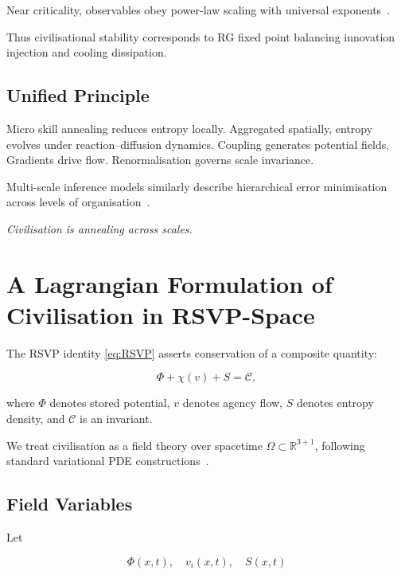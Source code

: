 \documentclass[12pt,a4paper]{article}
\theoremstyle{definition}
\begin{document}
Near criticality, observables obey power-law scaling
with universal exponents~\citep{stanley1971}.

Thus civilisational stability corresponds
to RG fixed point balancing innovation injection
and cooling dissipation.

\subsection{Unified Principle}

Micro skill annealing reduces entropy locally.
Aggregated spatially, entropy evolves under
reaction–diffusion dynamics.
Coupling generates potential fields.
Gradients drive flow.
Renormalisation governs scale invariance.

Multi-scale inference models similarly describe
hierarchical error minimisation across levels
of organisation~\citep{friston2023}.

\medskip
\begin{center}
  \itshape
  Civilisation is annealing across scales.
\end{center}


\section{A Lagrangian Formulation of Civilisation in RSVP-Space}
\label{sec:lagrangian}

The RSVP identity \eqref{eq:RSVP} asserts conservation of a composite
quantity:

\begin{equation}
  \Phi + \chi(v) + S = \mathcal{C},
\end{equation}

where $\Phi$ denotes stored potential,
$v$ denotes agency flow,
$S$ denotes entropy density,
and $\mathcal{C}$ is an invariant.

We treat civilisation as a field theory over spacetime
$\Omega \subset \mathbb{R}^{3+1}$,
following standard variational PDE constructions~\citep{evans2010}.

\subsection{Field Variables}

Let

\begin{equation}
  \Phi(x,t), \quad v_i(x,t), \quad S(x,t)
\end{equation}
\end{document}
